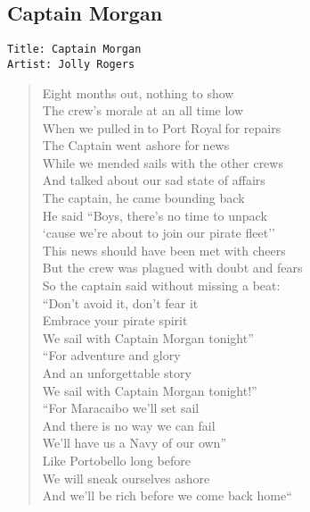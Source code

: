 \documentclass[11pt]{article}
\begin{document}
\subsection{Captain Morgan}
\label{sec:orgd674dca}
\begin{verbatim}
Title: Captain Morgan
Artist: Jolly Rogers
\end{verbatim}
\begin{verse}
Eight months out, nothing to show\\
The crew's morale at an all time low\\
When we pulled in to Port Royal for repairs\\
The Captain went ashore for news\\
While we mended sails with the other crews\\
And talked about our sad state of affairs\\
\vspace*{1em}
The captain, he came bounding back\\
He said ``Boys, there's no time to unpack\\
`cause we're about to join our pirate fleet''\\
This news should have been met with cheers\\
But the crew was plagued with doubt and fears\\
So the captain said without missing a beat:\\
\vspace*{1em}
``Don't avoid it, don't fear it\\
Embrace your pirate spirit\\
We sail with Captain Morgan tonight''\\
\vspace*{1em}
``For adventure and glory\\
And an unforgettable story\\
We sail with Captain Morgan tonight!''\\
\vspace*{1em}
``For Maracaibo we'll set sail\\
And there is no way we can fail\\
We'll have us a Navy of our own''\\
\vspace*{1em}
Like Portobello long before\\
We will sneak ourselves ashore\\
And we'll be rich before we come back home``\\
\vspace*{1em}

\end{verse}
\end{document}
